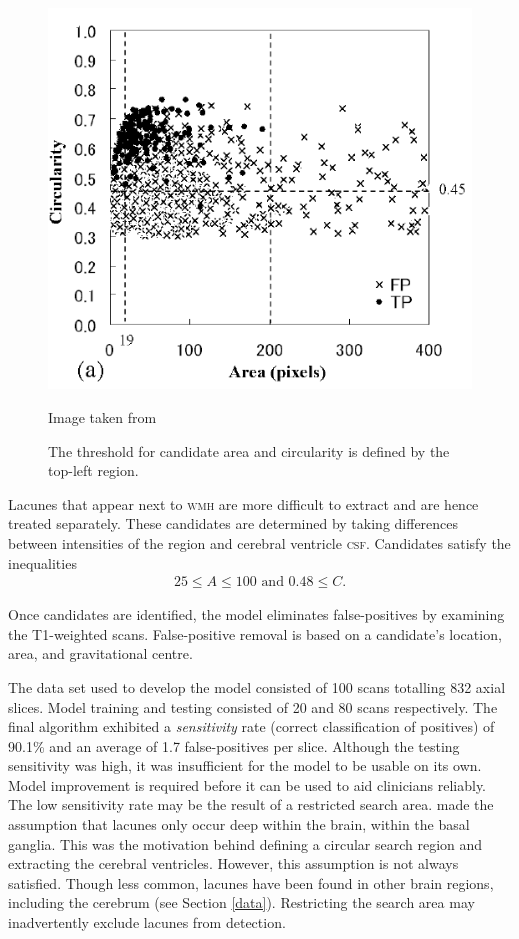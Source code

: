 \begin{figure}[ht]
\centering
\includegraphics[scale=0.7]{Images/5_yokoyama_reg.png}
\caption{\small{The threshold for candidate area and circularity is defined by the top-left region.}}
\small Image taken from \cite{Yokoyama2007}
\label{litrev-area-circ}
\end{figure}

\noindent Lacunes that appear next to \textsc{wmh} are more difficult to extract and are hence treated separately. These candidates are determined by taking differences between intensities of the region and cerebral ventricle \textsc{csf}. Candidates satisfy the inequalities
\begin{align*}
	25 \le A \le 100\text{ and } 0.48 \le C.
\end{align*}

Once candidates are identified, the model eliminates false-positives by examining the T1-weighted scans. False-positive removal is based on a candidate's location, area, and gravitational centre.

The data set used to develop the model consisted of 100 scans totalling 832 axial slices. Model training and testing consisted of 20 and 80 scans respectively. The final algorithm exhibited a \textit{sensitivity} rate (correct classification of positives) of 90.1\% and an average of 1.7 false-positives per slice. Although the testing sensitivity was high, it was insufficient for the model to be usable on its own. Model improvement is required before it can be used to aid clinicians reliably. The low sensitivity rate may be the result of a restricted search area. \cite{Yokoyama2007} made the assumption that lacunes only occur deep within the brain, within the basal ganglia. This was the motivation behind defining a circular search region and extracting the cerebral ventricles. However, this assumption is not always satisfied. Though less common, lacunes have been found in other brain regions, including the cerebrum (see Section \ref{data}). Restricting the search area may inadvertently exclude lacunes from detection.

